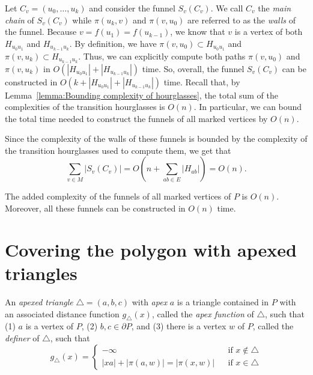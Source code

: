 \documentclass[a4paper,UKenglish]{lipics}
\newcommand{\fn}[2]{\ensuremath{S_{\scriptscriptstyle #1}(#2)}}
\newcommand{\ff}[1]{\ensuremath{f(#1)}}
\newcommand{\g}[2]{\ensuremath{|\pi(#1, #2)|}}
\newcommand{\p}[2]{\ensuremath{\pi(#1, #2)}}
\begin{document}
Let $C_v = (u_0, \ldots, u_k)$ and consider the funnel $\fn{v}{C_v}$.
We call $C_v$ the \emph{main chain} of $\fn{v}{C_v}$ while $\p{u_k}{ v}$ and $\p{v}{ u_0}$ are referred to as the \emph{walls} of the funnel.  
Because $v = \ff{u_1} = \ff{u_{k-1}}$, we know that $v$ is a vertex of both $H_{u_0 u_1}$ and  $H_{u_{k-1}u_k}$. 
By definition, we have $\p{v}{ u_0}\subset H_{u_0u_1}$ and $\p{v}{u_k}\subset H_{u_{k-1}u_k}$. Thus, we can explicitly compute both paths $\p{v}{ u_0}$ and $\p{v}{u_k}$ in $O( |H_{u_0 u_1}| + |H_{u_{k-1}u_k}|)$ time.
So, overall, the funnel $\fn{v}{C_v}$ can be constructed in $O(k + |H_{u_0 u_1}| + |H_{u_{k-1}u_k}|)$ time. 
Recall that, by Lemma~\ref{lemma:Bounding complexity of hourglasses}, the total sum of the complexities of the transition hourglasses is $O(n)$. In particular, we can bound the total time needed to construct the funnels of all marked vertices by $O(n)$. 

Since the complexity of the walls of these funnels is bounded by the complexity of the transition hourglasses used to compute them, we get that $$\sum_{v\in M} |\fn{v}{C_v}|  = O\left(n + \sum_{ab\in E} |H_{ab}|\right) = O(n).$$

\begin{lemma}\label{lemma: Marked vertices funnels construction}
The added complexity of the funnels of all marked vertices of $P$ is $O(n)$. 
Moreover, all these funnels can be constructed in $O(n)$ time.
\end{lemma}


\section{Covering the polygon with apexed triangles}\label{Section:Computing apexed triangles}
An \emph{apexed triangle} $\triangle = (a,b,c)$ with \emph{apex} $a$ is a triangle contained in $P$ with an associated distance function $g_\triangle(x)$, called the \emph{apex function} of $\triangle$, such that (1) $a$ is a vertex of $P$, (2) $b,c \in\partial P$, and (3) there is a  vertex $w$ of  $P$, called the \emph{definer} of $\triangle$, such that
$$g_\triangle(x) = \left\{ \begin{array}{lll}
-\infty&&\text{if $x\notin \triangle$}\\
|xa| + \g{a}{w} = \g{x}{w} && \text{if $x\in \triangle$}
\end{array}\right.$$
\end{document}

